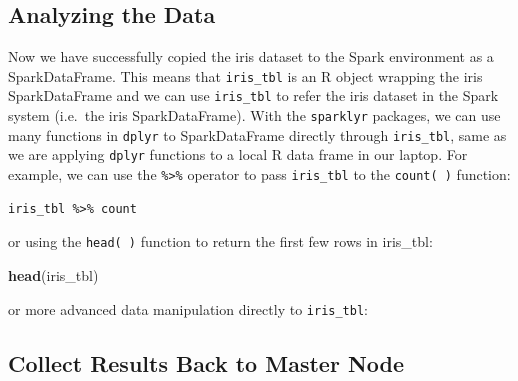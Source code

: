 \documentclass[]{book}
\newenvironment{Shaded}{\begin{snugshade}}{\end{snugshade}}
\newcommand{\KeywordTok}[1]{\textcolor[rgb]{0.13,0.29,0.53}{\textbf{{#1}}}}
\newcommand{\DataTypeTok}[1]{\textcolor[rgb]{0.13,0.29,0.53}{{#1}}}
\newcommand{\DecValTok}[1]{\textcolor[rgb]{0.00,0.00,0.81}{{#1}}}
\newcommand{\StringTok}[1]{\textcolor[rgb]{0.31,0.60,0.02}{{#1}}}
\newcommand{\CommentTok}[1]{\textcolor[rgb]{0.56,0.35,0.01}{\textit{{#1}}}}
\newcommand{\NormalTok}[1]{{#1}}
\theoremstyle{definition}
\theoremstyle{definition}
\theoremstyle{remark}
\begin{document}
\subsection{Analyzing the Data}\label{analyzing-the-data}

Now we have successfully copied the iris dataset to the Spark
environment as a SparkDataFrame. This means that \texttt{iris\_tbl} is
an R object wrapping the iris SparkDataFrame and we can use
\texttt{iris\_tbl} to refer the iris dataset in the Spark system
(i.e.~the iris SparkDataFrame). With the \texttt{sparklyr} packages, we
can use many functions in \texttt{dplyr} to SparkDataFrame directly
through \texttt{iris\_tbl}, same as we are applying \texttt{dplyr}
functions to a local R data frame in our laptop. For example, we can use
the \texttt{\%\textgreater{}\%} operator to pass \texttt{iris\_tbl} to
the \texttt{count(\ )} function:

\begin{verbatim}
iris_tbl %>% count
\end{verbatim}

or using the \texttt{head(\ )} function to return the first few rows in
iris\_tbl:

\begin{Shaded}
\begin{Highlighting}[]
\KeywordTok{head}\NormalTok{(iris_tbl)}
\end{Highlighting}
\end{Shaded}

or more advanced data manipulation directly to \texttt{iris\_tbl}:

\begin{Shaded}
\end{Shaded}

\subsection{Collect Results Back to Master
Node}\label{collect-results-back-to-master-node}
\end{document}
